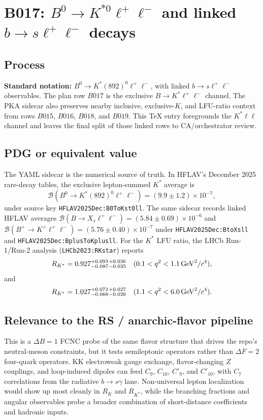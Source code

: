 
\section{B017: \(B^0\to K^{*0}\ell^+\ell^-\) and linked \(b\to s\ell^+\ell^-\) decays}

\subsection*{Process}
\textbf{Standard notation:} \(B^0\to K^{*}(892)^0\ell^+\ell^-\), with linked
\(b\to s\ell^+\ell^-\) observables.
The plan row \(B017\) is the exclusive \(B\to K^*\ell^+\ell^-\) channel.  The
PKA sidecar also preserves nearby inclusive, exclusive-\(K\), and LFU-ratio
context from rows \(B015\), \(B016\), \(B018\), and \(B019\).  This TeX entry
foregrounds the \(K^*\ell\ell\) channel and leaves the final split of those
linked rows to CA/orchestrator review.

\subsection*{PDG or equivalent value}
The YAML sidecar is the numerical source of truth.  In HFLAV's December 2025
rare-decay tables, the exclusive lepton-summed \(K^*\) average is
\[
  \mathcal B(B^0\to K^{*}(892)^0\ell^+\ell^-)
  =(9.9\pm1.2)\times10^{-7},
\]
under source key \texttt{HFLAV2025Dec:B0ToKst0ll}.  The same sidecar records
linked HFLAV averages
\(\mathcal B(B\to X_s\ell^+\ell^-)=(5.84\pm0.69)\times10^{-6}\) and
\(\mathcal B(B^+\to K^+\ell^+\ell^-)=(5.76\pm0.40)\times10^{-7}\) under
\texttt{HFLAV2025Dec:BtoXsll} and \texttt{HFLAV2025Dec:BplusToKplusll}.  For
the \(K^*\) LFU ratio, the LHCb Run-1/Run-2 analysis
(\texttt{LHCb2023:RKstar}) reports
\[
  R_{K^*}=0.927^{+0.093}_{-0.087}{}^{+0.036}_{-0.035}
  \quad(0.1<q^2<1.1\,{\rm GeV}^2/c^4),
\]
and
\[
  R_{K^*}=1.027^{+0.072}_{-0.068}{}^{+0.027}_{-0.026}
  \quad(1.1<q^2<6.0\,{\rm GeV}^2/c^4).
\]

\subsection*{Relevance to the RS / anarchic-flavor pipeline}
This is a \(\Delta B=1\) FCNC probe of the same flavor structure that drives
the repo's neutral-meson constraints, but it tests semileptonic operators rather
than \(\Delta F=2\) four-quark operators.  KK electroweak gauge exchange,
flavor-changing \(Z\) couplings, and loop-induced dipoles can feed \(C_9\),
\(C_{10}\), \(C'_9\), and \(C'_{10}\), with \(C_7\) correlations from the
radiative \(b\to s\gamma\) lane.  Non-universal lepton localization would show
up most cleanly in \(R_K\) and \(R_{K^*}\), while the branching fractions and
angular observables probe a broader combination of short-distance coefficients
and hadronic inputs.

